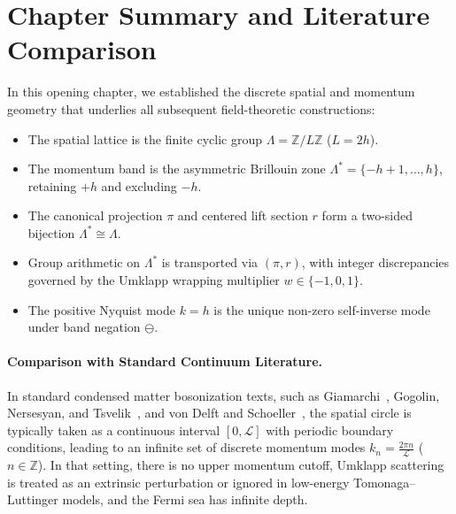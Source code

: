 \section{Chapter Summary and Literature Comparison}

In this opening chapter, we established the discrete spatial and momentum geometry that underlies all subsequent field-theoretic constructions:
\begin{itemize}
    \item The spatial lattice is the finite cyclic group $\Lambda = \mathbb{Z}/L\mathbb{Z}$ ($L = 2h$).
    \item The momentum band is the asymmetric Brillouin zone $\Lambda^* = \{-h+1, \dots, h\}$, retaining $+h$ and excluding $-h$.
    \item The canonical projection $\pi$ and centered lift section $r$ form a two-sided bijection $\Lambda^* \cong \Lambda$.
    \item Group arithmetic on $\Lambda^*$ is transported via $(\pi, r)$, with integer discrepancies governed by the Umklapp wrapping multiplier $w \in \{-1, 0, 1\}$.
    \item The positive Nyquist mode $k = h$ is the unique non-zero self-inverse mode under band negation $\ominus$.
\end{itemize}

\paragraph{Comparison with Standard Continuum Literature.}
In standard condensed matter bosonization texts, such as Giamarchi~\cite{giamarchi2004}, Gogolin, Nersesyan, and Tsvelik~\cite{gogolin1998}, and von Delft and Schoeller~\cite{vondelft1998}, the spatial circle is typically taken as a continuous interval $[0, \mathcal{L}]$ with periodic boundary conditions, leading to an infinite set of discrete momentum modes $k_n = \frac{2\pi n}{\mathcal{L}}$ ($n \in \mathbb{Z}$). In that setting, there is no upper momentum cutoff, Umklapp scattering is treated as an extrinsic perturbation or ignored in low-energy Tomonaga--Luttinger models, and the Fermi sea has infinite depth.

